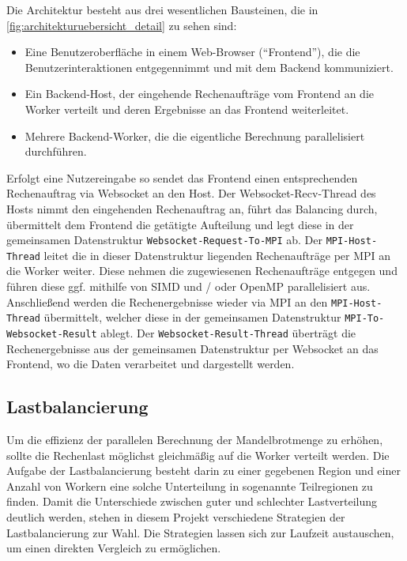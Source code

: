 Die Architektur besteht aus drei wesentlichen Bausteinen, die in \autoref{fig:architekturuebersicht_detail} zu sehen sind:
\begin{itemize}
	\item Eine Benutzeroberfläche in einem Web-Browser (“Frontend”), die die Benutzerinteraktionen entgegennimmt und mit dem Backend kommuniziert.
	\item Ein Backend-Host, der eingehende Rechenaufträge vom Frontend an die Worker verteilt und deren Ergebnisse an das Frontend weiterleitet.
	\item Mehrere Backend-Worker, die die eigentliche Berechnung parallelisiert durchführen.
\end{itemize}
Erfolgt eine Nutzereingabe so sendet das Frontend einen entsprechenden Rechenauftrag via Websocket an den Host.
Der Websocket-Recv-Thread des Hosts nimmt den eingehenden Rechenauftrag an, führt das Balancing durch,
übermittelt dem Frontend die getätigte Aufteilung und legt diese in der gemeinsamen Datenstruktur \verb|Websocket-Request-To-MPI| ab.
Der \verb|MPI-Host-Thread| leitet die in dieser Datenstruktur liegenden Rechenaufträge per MPI an die Worker weiter.
Diese nehmen die zugewiesenen Rechenaufträge entgegen und führen diese ggf. mithilfe von SIMD und / oder OpenMP parallelisiert aus.
Anschließend werden die Rechenergebnisse wieder via MPI an den \verb|MPI-Host-Thread| übermittelt,
welcher diese in der gemeinsamen Datenstruktur \verb|MPI-To-Websocket-Result| ablegt.
Der \verb|Websocket-Result-Thread| überträgt die Rechenergebnisse aus der gemeinsamen Datenstruktur per Websocket an das Frontend, 
wo die Daten verarbeitet und dargestellt werden.

\subsection{Lastbalancierung}\label{sec:load_balancing_concepts}
Um die effizienz der parallelen Berechnung der Mandelbrotmenge zu erhöhen, sollte die Rechenlast möglichst gleichmäßig auf die Worker verteilt werden.
Die Aufgabe der Lastbalancierung besteht darin zu einer gegebenen Region und einer Anzahl von Workern eine solche Unterteilung in sogenannte Teilregionen zu finden.
Damit die Unterschiede zwischen guter und schlechter Lastverteilung deutlich werden, stehen in diesem Projekt verschiedene Strategien der Lastbalancierung zur Wahl.
Die Strategien lassen sich zur Laufzeit austauschen, um einen direkten Vergleich zu ermöglichen.

